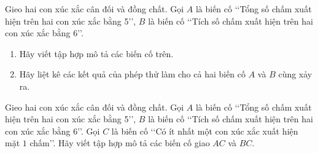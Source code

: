 \begin{bt}
	Gieo hai con xúc xắc cân đối và đồng chất. Gọi $A$ là biến cố \lq\lq  Tổng số chấm xuất hiện trên hai con xúc xắc bằng 5\rq\rq, $B$ là biến cố \lq\lq  Tích số chấm xuất hiện trên hai con xúc xắc bằng 6\rq\rq.
	\begin{enumerate}
	\item Hãy viết tập hợp mô tả các biến cố trên.
	\item Hãy liệt kê các kết quả của phép thử làm cho cả hai biến cố $A$ và $B$ cùng xảy ra.
	\end{enumerate}
\end{bt}
\begin{bt}
	Gieo hai con xúc xắc cân đối và đồng chất. Gọi $A$ là biến cố \lq\lq  Tổng số chấm xuất hiện trên hai con xúc xắc bằng 5\rq\rq, $B$ là biến cố \lq\lq  Tích số chấm xuất hiện trên hai con xúc xắc bằng 6\rq\rq. Gọi $C$ là biến cố \lq\lq  Có ít nhất một con xúc xắc xuất hiện mặt $1$ chấm\rq\rq. Hãy viết tập hợp mô tả các biến cố giao $AC$ và $BC$.
\end{bt}

